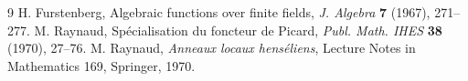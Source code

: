 \documentclass[11pt]{article}
\begin{document}
\begin{thebibliography}{9}
 H. Furstenberg, Algebraic functions over finite fields, \emph{J. Algebra} \textbf{7} (1967), 271--277.
 M. Raynaud, Spécialisation du foncteur de Picard, \emph{Publ. Math. IHES} \textbf{38} (1970), 27--76.
 M. Raynaud, \emph{Anneaux locaux henséliens}, Lecture Notes in Mathematics 169, Springer, 1970.
\end{thebibliography}
\end{document}

